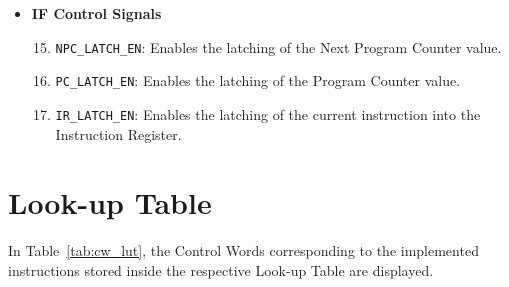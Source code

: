 \begin{itemize}
	\item \textbf{IF Control Signals}
	\begin{enumerate}
		\setcounter{enumi}{14}	
		\item \texttt{NPC\_LATCH\_EN}: Enables the latching of the Next Program Counter value.
		\item \texttt{PC\_LATCH\_EN}: Enables the latching of the Program Counter value.
		\item \texttt{IR\_LATCH\_EN}: Enables the latching of the current instruction into the Instruction Register.
	\end{enumerate}
 
\end{itemize}

\section{Look-up Table}
In Table~\ref{tab:cw_lut}, the Control Words corresponding to the implemented instructions stored inside the respective Look-up Table are displayed.

